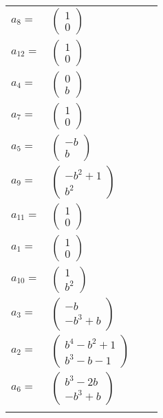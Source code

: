 \documentclass[1p]{elsarticle_modified}
\theoremstyle{definition}
\begin{document}
\begin{tabular}{m{7pt} m{180pt} m{7pt} m{180pt} }
\flushright $a_{8}=$&$\begin{pmatrix}1\\0\end{pmatrix}$ \\
\flushright $a_{12}=$&$\begin{pmatrix}1\\0\end{pmatrix}$ \\
\flushright $a_{4}=$&$\begin{pmatrix}0\\b\end{pmatrix}$ \\
\flushright $a_{7}=$&$\begin{pmatrix}1\\0\end{pmatrix}$ \\
\flushright $a_{5}=$&$\begin{pmatrix}- b\\b\end{pmatrix}$ \\
\flushright $a_{9}=$&$\begin{pmatrix}- b^2+1\\b^2\end{pmatrix}$ \\
\flushright $a_{11}=$&$\begin{pmatrix}1\\0\end{pmatrix}$ \\
\flushright $a_{1}=$&$\begin{pmatrix}1\\0\end{pmatrix}$ \\
\flushright $a_{10}=$&$\begin{pmatrix}1\\b^2\end{pmatrix}$ \\
\flushright $a_{3}=$&$\begin{pmatrix}- b\\- b^3+b\end{pmatrix}$ \\
\flushright $a_{2}=$&$\begin{pmatrix}b^4- b^2+1\\b^3- b-1\end{pmatrix}$ \\
\flushright $a_{6}=$&$\begin{pmatrix}b^3-2 b\\- b^3+b\end{pmatrix}$\\&\end{tabular}
\end{document}
